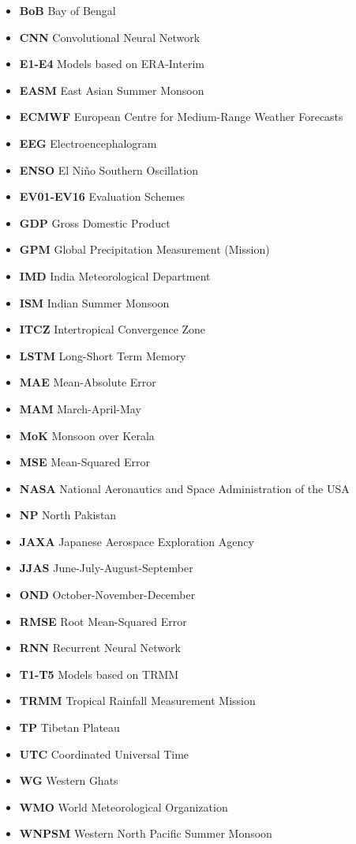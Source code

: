 \begin{abbreviations}
  \label{abbreviations}
  \begin{itemize}[leftmargin=*]
    \item[] \textbf{BoB} Bay of Bengal
    \item[] \textbf{CNN} Convolutional Neural Network
    \item[] \textbf{E1-E4} Models based on ERA-Interim
    \item[] \textbf{EASM} East Asian Summer Monsoon
    \item[] \textbf{ECMWF} European Centre for Medium-Range Weather Forecasts
    \item[] \textbf{EEG} Electroencephalogram
    \item[] \textbf{ENSO} El Niño Southern Oscillation
    \item[] \textbf{EV01-EV16} Evaluation Schemes
    \item[] \textbf{GDP} Gross Domestic Product
    \item[] \textbf{GPM} Global Precipitation Measurement (Mission)
    \item[] \textbf{IMD} India Meteorological Department
    \item[] \textbf{ISM} Indian Summer Monsoon
    \item[] \textbf{ITCZ} Intertropical Convergence Zone
    \item[] \textbf{LSTM} Long-Short Term Memory
    \item[] \textbf{MAE} Mean-Absolute Error
    \item[] \textbf{MAM} March-April-May
    \item[] \textbf{MoK} Monsoon over Kerala
    \item[] \textbf{MSE} Mean-Squared Error
    \item[] \textbf{NASA} National Aeronautics and Space Administration of the USA
    \item[] \textbf{NP} North Pakistan
    \item[] \textbf{JAXA} Japanese Aerospace Exploration Agency
    \item[] \textbf{JJAS} June-July-August-September
    \item[] \textbf{OND} October-November-December
    \item[] \textbf{RMSE} Root Mean-Squared Error
    \item[] \textbf{RNN} Recurrent Neural Network
    \item[] \textbf{T1-T5} Models based on TRMM
    \item[] \textbf{TRMM} Tropical Rainfall Measurement Mission
    \item[] \textbf{TP} Tibetan Plateau
    \item[] \textbf{UTC} Coordinated Universal Time
    \item[] \textbf{WG} Western Ghats
    \item[] \textbf{WMO} World Meteorological Organization
    \item[] \textbf{WNPSM} Western North Pacific Summer Monsoon
  \end{itemize}
\end{abbreviations}
